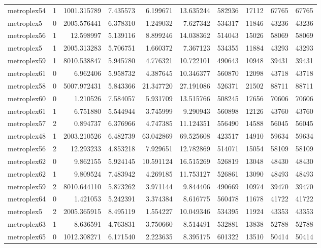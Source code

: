 \begin{longtable}{|l|r|r|r|r|r|r|r|r|r|}
metroplex54 & 1 & 1001.315789 & 7.435573 & 6.199671 & 13.635244 & 582936 & 17112 & 67765 & 67765 \\
metroplex5 & 0 & 2005.576441 & 6.378310 & 1.249032 & 7.627342 & 534317 & 11846 & 43236 & 43236 \\
metroplex56 & 1 & 12.598997 & 5.139116 & 8.899246 & 14.038362 & 514043 & 15026 & 58069 & 58069 \\
metroplex5 & 1 & 2005.313283 & 5.706751 & 1.660372 & 7.367123 & 534355 & 11884 & 43293 & 43293 \\
metroplex59 & 1 & 8010.538847 & 5.945780 & 4.776321 & 10.722101 & 490643 & 10948 & 39431 & 39431 \\
metroplex61 & 0 & 6.962406 & 5.958732 & 4.387645 & 10.346377 & 560870 & 12098 & 43718 & 43718 \\
metroplex58 & 0 & 5007.972431 & 5.843366 & 21.347720 & 27.191086 & 526371 & 21502 & 88711 & 88711 \\
metroplex60 & 0 & 1.210526 & 7.584057 & 5.931709 & 13.515766 & 508245 & 17656 & 70606 & 70606 \\
metroplex61 & 1 & 6.751880 & 5.544944 & 3.745999 & 9.290943 & 560898 & 12126 & 43760 & 43760 \\
metroplex57 & 2 & 0.894737 & 6.376966 & 4.747385 & 11.124351 & 556490 & 14588 & 56045 & 56045 \\
metroplex48 & 1 & 2003.210526 & 6.482739 & 63.042869 & 69.525608 & 423517 & 14910 & 59634 & 59634 \\
metroplex56 & 2 & 12.293233 & 4.853218 & 7.929651 & 12.782869 & 514071 & 15054 & 58109 & 58109 \\
metroplex62 & 0 & 9.862155 & 5.924145 & 10.591124 & 16.515269 & 526819 & 13048 & 48430 & 48430 \\
metroplex62 & 1 & 9.809524 & 7.483942 & 4.269185 & 11.753127 & 526861 & 13090 & 48493 & 48493 \\
metroplex59 & 2 & 8010.644110 & 5.873262 & 3.971144 & 9.844406 & 490669 & 10974 & 39470 & 39470 \\
metroplex64 & 0 & 1.421053 & 5.242391 & 3.374384 & 8.616775 & 560478 & 11678 & 41722 & 41722 \\
metroplex5 & 2 & 2005.365915 & 8.495119 & 1.554227 & 10.049346 & 534395 & 11924 & 43353 & 43353 \\
metroplex63 & 1 & 8.636591 & 4.763831 & 3.750660 & 8.514491 & 532881 & 13838 & 52788 & 52788 \\
metroplex65 & 0 & 1012.308271 & 6.171540 & 2.223635 & 8.395175 & 601322 & 13510 & 50414 & 50414 \\

\end{longtable}
